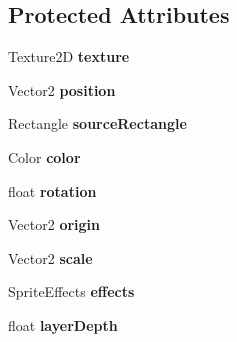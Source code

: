 \subsection*{Protected Attributes}
\begin{DoxyCompactItemize}
\item 
Texture2D {\bfseries texture}\hypertarget{class_phys_k_1_1_sprite_a700ed22d527abcd398cfed27ee0eab3e}{}\label{class_phys_k_1_1_sprite_a700ed22d527abcd398cfed27ee0eab3e}

\item 
Vector2 {\bfseries position}\hypertarget{class_phys_k_1_1_sprite_abc08b4b85e5c7adb45610d6b7d9c5596}{}\label{class_phys_k_1_1_sprite_abc08b4b85e5c7adb45610d6b7d9c5596}

\item 
Rectangle {\bfseries source\+Rectangle}\hypertarget{class_phys_k_1_1_sprite_a0e20a182532b3f51de81d677f8ad9ee7}{}\label{class_phys_k_1_1_sprite_a0e20a182532b3f51de81d677f8ad9ee7}

\item 
Color {\bfseries color}\hypertarget{class_phys_k_1_1_sprite_abe122a062077d1bb8face31da2bb43c4}{}\label{class_phys_k_1_1_sprite_abe122a062077d1bb8face31da2bb43c4}

\item 
float {\bfseries rotation}\hypertarget{class_phys_k_1_1_sprite_a53ede37cf42dc8a8fae8d465c83f508f}{}\label{class_phys_k_1_1_sprite_a53ede37cf42dc8a8fae8d465c83f508f}

\item 
Vector2 {\bfseries origin}\hypertarget{class_phys_k_1_1_sprite_a8901ac895ab2c84e24185d7ec834ed99}{}\label{class_phys_k_1_1_sprite_a8901ac895ab2c84e24185d7ec834ed99}

\item 
Vector2 {\bfseries scale}\hypertarget{class_phys_k_1_1_sprite_ab8683f97d567104eb7b9a696890be4f1}{}\label{class_phys_k_1_1_sprite_ab8683f97d567104eb7b9a696890be4f1}

\item 
Sprite\+Effects {\bfseries effects}\hypertarget{class_phys_k_1_1_sprite_ac8056ded4665d81a5628e90b09ad5c57}{}\label{class_phys_k_1_1_sprite_ac8056ded4665d81a5628e90b09ad5c57}

\item 
float {\bfseries layer\+Depth}\hypertarget{class_phys_k_1_1_sprite_a19dbf7f46015e598e1eb7ef37c4941bb}{}\label{class_phys_k_1_1_sprite_a19dbf7f46015e598e1eb7ef37c4941bb}

\end{DoxyCompactItemize}

